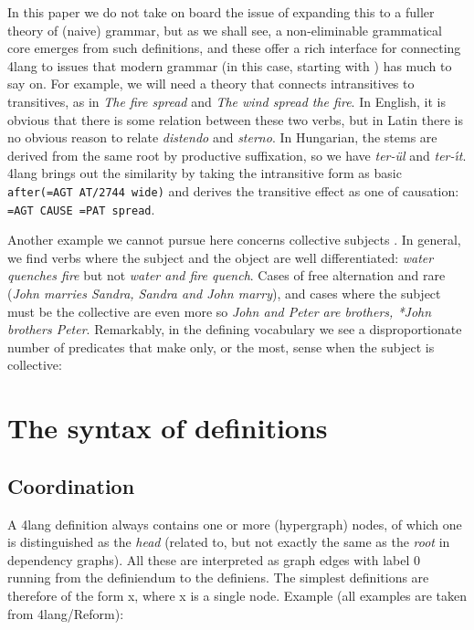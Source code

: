 \documentclass[11pt,bookmarks,bookmarksnumbered,naturalnames,plainpages=false,pdftex,colorlinks=true,urlcolor=blue,bookmarksdepth=subsection,plainpages=false]{paper}
\begin{document}
In this paper we do not take on board the issue of expanding this to a fuller
theory of (naive) grammar, but as we shall see, a non-eliminable grammatical
core emerges from such definitions, and these offer a rich interface for
connecting 4lang to issues that modern grammar (in this case, starting with
\cite{Fillmore:1968}) has much to say on. For example, we will need a theory
that connects intransitives to transitives, as in {\it The fire spread} and
{\it The wind spread the fire}. In English, it is obvious that there is some
relation between these two verbs, but in Latin there is no obvious reason to
relate {\it distendo} and {\it sterno}. In Hungarian, the stems are derived
from the same root by productive suffixation, so we have {\it ter-\"ul} and
{\it ter-\'{\i}t}. 4lang brings out the similarity by taking the intransitive
form as basic {\tt after(=AGT AT/2744 wide)} and derives the transitive effect
as one of causation: {\tt =AGT CAUSE {=PAT spread}}.

Another example we cannot pursue here concerns collective subjects
\citep{Scha:1981}. In general, we find verbs where the subject and the object
are well differentiated: {\it water quenches fire} but not {\it *water and
  fire quench}. Cases of free alternation and rare ({\it John marries Sandra,
  Sandra and John marry}), and cases where the subject must be the collective
are even more so {\it John and Peter are brothers, *John brothers
  Peter}. Remarkably, in the defining vocabulary we see a disproportionate
number of predicates that make only, or the most, sense when the subject is
collective: %


\section{The syntax of definitions}\label{8thcol}

\subsection{Coordination}\label{comma}

A 4lang definition always contains one or more (hypergraph) nodes, of which
one is distinguished as the {\it head} (related to, but not exactly the same
as the {\it root} in dependency graphs). All these are interpreted as graph
edges with label 0 running from the definiendum to the definiens.  The simplest
definitions are therefore of the form x, where x is a single node. Example
(all examples are taken from 4lang/Reform):
\end{document}
